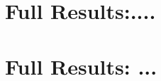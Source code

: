 \begin{appendices}
\newpage
{}   

\chapter{Full Results:....}
\label{chapter:appendix_experimental_results_1}
\setcounter{table}{0}
\renewcommand{\thetable}{A.\arabic{table}}
\setcounter{figure}{0}
\renewcommand{\thefigure}{A.\arabic{figure}}

\newpage






\chapter{Full Results: ...}
\label{chapter:appendix_experimental_results_2}
\setcounter{table}{0}
\renewcommand{\thetable}{B.\arabic{table}}
\setcounter{figure}{0}
\renewcommand{\thefigure}{B.\arabic{figure}}
 
 
 
\newpage 


 

\end{appendices}